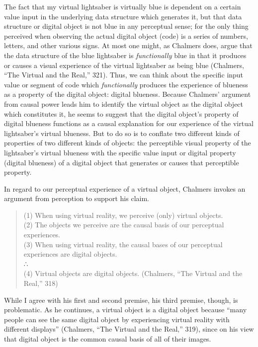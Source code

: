 \documentclass{article}
\begin{document}
The fact that my virtual lightsaber is virtually blue is dependent on a certain value input in the underlying data structure which generates it, but that data structure or digital object is not blue in any perceptual sense; for the only thing perceived when observing the actual digital object (code) is a series of numbers, letters, and other various signs. At most one might, as Chalmers does, argue that the data structure of the blue lightsaber is \textit{functionally} blue in that it produces or causes a visual experience of the virtual lightsaber as being blue (Chalmers, “The Virtual and the Real,” 321). Thus, we can think about the specific input value or segment of code which \textit{functionally} produces the experience of blueness as a property of the digital object: digital blueness. Because Chalmers’ argument from causal power leads him to identify the virtual object as the digital object which constitutes it, he seems to suggest that the digital object’s property of digital blueness functions as a causal explanation for our experience of the virtual lightsaber’s virtual blueness. But to do so is to conflate two different kinds of properties of two different kinds of objects: the perceptible visual property of the lightsaber’s virtual blueness with the specific value input or digital property (digital blueness) of a digital object that generates or causes that perceptible property.

In regard to our perceptual experience of a virtual object, Chalmers invokes an argument from perception to support his claim.

\begin{quote}
(1) When using virtual reality, we perceive (only) virtual objects. \\
(2) The objects we perceive are the causal basis of our perceptual experiences. \\
(3) When using virtual reality, the causal bases of our perceptual experiences are digital objects. \\
∴ \\
(4) Virtual objects are digital objects. (Chalmers, “The Virtual and the Real,” 318)
\end{quote}

While I agree with his first and second premise, his third premise, though, is problematic. As he continues, a virtual object is a digital object because “many people can see the same digital object by experiencing virtual reality with different displays” (Chalmers, “The Virtual and the Real,” 319), since on his view that digital object is the common causal basis of all of their images.
\end{document}
